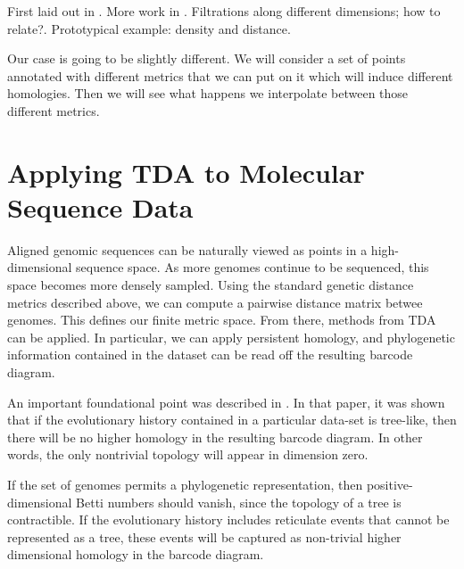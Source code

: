 First laid out in \cite{Carlsson:2009b}.
More work in \cite{Lesnick:2012uv}.
Filtrations along different dimensions; how to relate?.
Prototypical example: density and distance.

Our case is going to be slightly different.
We will consider a set of points annotated with different metrics that we can put on it which will induce different homologies.
Then we will see what happens we interpolate between those different metrics.


\section{Applying TDA to Molecular Sequence Data}

Aligned genomic sequences can be naturally viewed as points in a high-dimensional sequence space.
As more genomes continue to be sequenced, this space becomes more densely sampled.
Using the standard genetic distance metrics described above, we can compute a pairwise distance matrix betwee genomes.
This defines our finite metric space.
From there, methods from TDA can be applied.
In particular, we can apply persistent homology, and phylogenetic information contained in the dataset can be read off the resulting barcode diagram.

An important foundational point was described in \cite{Chan:2013}.
In that paper, it was shown that if the evolutionary history contained in a particular data-set is tree-like, then there will be no higher homology in the resulting barcode diagram.
In other words, the only nontrivial topology will appear in dimension zero.

If the set of genomes permits a phylogenetic representation, then positive-dimensional Betti numbers should vanish, since the topology of a tree is contractible. 
If the evolutionary history includes reticulate events that cannot be represented as a tree, these events will be captured as non-trivial higher dimensional homology in the barcode diagram.

